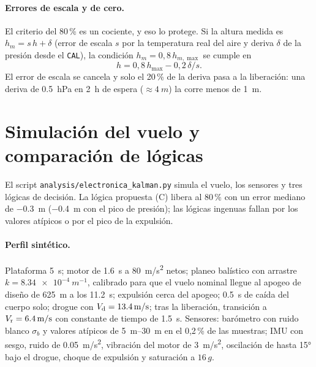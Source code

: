 \paragraph{Errores de escala y de cero.} El criterio del 80\,\% es un cociente, y eso lo
protege. Si la altura medida es $h_m=s\,h+\delta$ (error de escala $s$ por la temperatura
real del aire y deriva $\delta$ de la presión desde el \texttt{CAL}), la condición
$h_m=0{,}8\,h_{m,\max}$ se cumple en
\begin{equation}
  h = 0{,}8\,h_{\max} - 0{,}2\,\delta/s.
  \label{eq:electronica-cociente}
\end{equation}
El error de escala se cancela y solo el 20\,\% de la deriva pasa a la liberación: una deriva
de \SI{0.5}{hPa} en \SI{2}{h} de espera ($\approx\SI{4}{m}$) la corre menos de \SI{1}{m}.

\section{Simulación del vuelo y comparación de lógicas}\label{sec:electronica-sim}

El script \texttt{analysis/electronica\_kalman.py} simula el vuelo, los sensores y tres
lógicas de decisión. La lógica propuesta (C) libera al 80\,\% con un error mediano de
\SI{-0.3}{m} (\SI{-0.4}{m} con el pico de presión); las lógicas ingenuas fallan por los
valores atípicos o por el pico de la expulsión.

\paragraph{Perfil sintético.} Plataforma \SI{5}{s}; motor de \SI{1.6}{s} a
\SI{80}{m/s^2} netos; planeo balístico con arrastre $k=\SI{8.34e-4}{m^{-1}}$, calibrado
para que el vuelo nominal llegue al apogeo de diseño de \SI{625}{m} a los \SI{11.2}{s};
expulsión cerca del apogeo; \SI{0.5}{s}
de caída del cuerpo solo; drogue con $V_{\mathrm{d}}=\SI{13.4}{m/s}$; tras la liberación, transición a
$V_{\mathrm{r}}=\SI{6.4}{m/s}$ con constante de tiempo de \SI{1.5}{s}. Sensores: barómetro con ruido
blanco $\sigma_b$ y valores atípicos de \SIrange{5}{30}{m} en el 0,2\,\% de las muestras;
IMU con sesgo, ruido de \SI{0.05}{m/s^2}, vibración del motor de \SI{3}{m/s^2},
oscilación de hasta \ang{15} bajo el drogue, choque de expulsión y saturación a $16\,g$.

